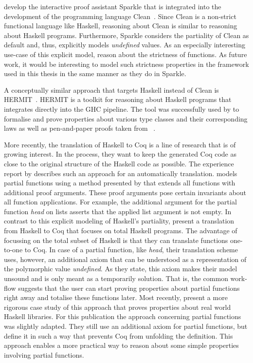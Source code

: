 \citet{demol2002theorem} develop the interactive proof assistant Sparkle that is integrated into the development of  the programming language Clean~\citep{brus1987clean}.
Since Clean is a non-strict functional language like Haskell, reasoning about Clean is similar to reasoning about Haskell programs.
Furthermore, Sparkle considers the partiality of Clean as default and, thus, explicitly models \emph{undefined} values.
As an especially interesting use-case of this explicit model, \citet{vaneekelen2006proof} reason about the strictness of functions.
As future work, it would be interesting to model such strictness properties in the framework used in this thesis in the same manner as they do in Sparkle.

A conceptually similar approach that targets Haskell instead of Clean is HERMIT~\citep{farmer2015reasoning}.
HERMIT is a toolkit for reasoning about Haskell programs that integrates directly into the GHC pipeline.
The tool was successfully used by \citeauthor{farmer2015reasoning} to formalise and prove properties about various type classes and their corresponding laws as well as pen-and-paper proofs taken from ~\citep{bird2010pearls}.

More recently, the translation of Haskell to Coq is a line of research that is of growing interest.
In the process, they want to keep the generated Coq code as close to the original structure of the Haskell code as possible.
The experience report by \citet{dijkstra2012experimentation} describes such an approach for an automatically translation.
\citeauthor{dijkstra2012experimentation} models partial functions using a method presented by \citet{bove2007computation} that extends all functions with additional proof arguments.
These proof arguments pose certain invariants about all function applications.
For example, the additional argument for the partial function \emph{head} on lists asserts that the applied list argument is not empty.
In contrast to this explicit modeling of Haskell's partiality, \citet{spector-zabusky2018total} present a translation from Haskell to Coq that focuses on total Haskell programs.
The advantage of focussing on the total subset of Haskell is that they can translate functions one-to-one to Coq.
In case of a partial function, like \emph{head}, their translation scheme uses, however, an additional axiom that can be understood as a representation of the polymorphic value \emph{undefined}.
As they state, this axiom makes their model unsound and is only meant as a temporarily solution.
That is, the common work-flow suggests that the user can start proving properties about partial functions right away and totalise these functions later.
Most recently, \citet{breitner2018ready} present a more rigorous case study of this approach that proves properties about real world Haskell libraries.
For this publication the approach concerning partial functions was slightly adapted.
They still use an additional axiom for partial functions, but define it in such a way that prevents Coq from unfolding the definition.
This approach enables a more practical way to reason about some simple properties involving partial functions.

